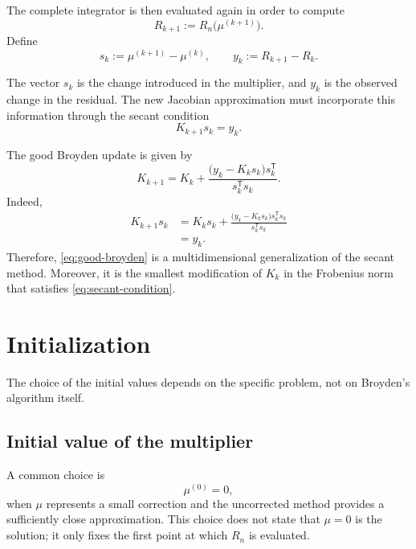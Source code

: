 \documentclass[11pt,a4paper]{article}
\begin{document}
The complete integrator is then evaluated again in order to compute
\[
    R_{k+1}:=R_n\bigl(\mu^{(k+1)}\bigr).
\]
Define
\begin{equation}
    s_k:=\mu^{(k+1)}-\mu^{(k)},
    \qquad
    y_k:=R_{k+1}-R_k.
    \label{eq:secant-vectors}
\end{equation}

The vector $s_k$ is the change introduced in the multiplier, and $y_k$ is the
observed change in the residual. The new Jacobian approximation must
incorporate this information through the secant condition
\begin{equation}
    K_{k+1}s_k=y_k.
    \label{eq:secant-condition}
\end{equation}

The good Broyden update is given by
\begin{equation}
    \boxed{
    K_{k+1}
    =K_k+
    \frac{\bigl(y_k-K_ks_k\bigr)s_k^{\mathsf T}}
         {s_k^{\mathsf T}s_k}.}
    \label{eq:good-broyden}
\end{equation}
Indeed,
\[
\begin{aligned}
    K_{k+1}s_k
    &=K_ks_k
      +\frac{\bigl(y_k-K_ks_k\bigr)s_k^{\mathsf T}s_k}
             {s_k^{\mathsf T}s_k}\\
    &=y_k.
\end{aligned}
\]
Therefore, \eqref{eq:good-broyden} is a multidimensional generalization of
the secant method. Moreover, it is the smallest modification of $K_k$ in the
Frobenius norm that satisfies \eqref{eq:secant-condition}.

\section{Initialization}

The choice of the initial values depends on the specific problem, not on
Broyden's algorithm itself.

\subsection{Initial value of the multiplier}

A common choice is
\begin{equation}
    \mu^{(0)}=0,
    \label{eq:zero-initial-multiplier}
\end{equation}
when $\mu$ represents a small correction and the uncorrected method provides a
sufficiently close approximation. This choice does not state that $\mu=0$ is
the solution; it only fixes the first point at which $R_n$ is evaluated.
\end{document}
